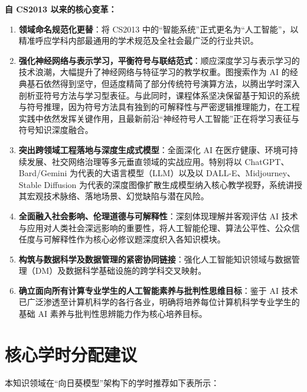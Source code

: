 \begin{preamblebox}[知识领域概述与变革]
\textbf{自 CS2013 以来的核心变革：}
\begin{enumerate}
    \item \textbf{领域命名规范化更替}：将 CS2013 中的“智能系统”正式更名为“人工智能”，以精准呼应学科内部最通用的学术规范及全社会最广泛的行业共识。
    \item \textbf{强化神经网络与表示学习，平衡符号与联结范式}：顺应深度学习与表示学习的技术浪潮，大幅提升了神经网络与特征学习的教学权重。图搜索作为 AI 的经典基石依然得到坚守，但适度精简了部分传统符号演算方法，以腾出学时深入剖析亚符号方法与学习型表征。与此同时，课程体系坚决保留基于知识的系统与符号推理，因为符号方法具有独到的可解释性与严密逻辑推理能力，在工程实践中依然发挥关键作用，且最新前沿“神经符号人工智能”正在将学习表征与符号知识深度融合。
    \item \textbf{突出跨领域工程落地与深度生成式模型}：全面深化 AI 在医疗健康、环境可持续发展、社交网络治理等多元垂直领域的实战应用。特别将以 ChatGPT、Bard/Gemini 为代表的大语言模型（LLM）以及以 DALL-E、Midjourney、Stable Diffusion 为代表的深度图像扩散生成模型纳入核心教学视野，系统讲授其宏观技术脉络、落地场景、幻觉缺陷与潜在风险。
    \item \textbf{全面融入社会影响、伦理道德与可解释性}：深刻体现理解并客观评估 AI 技术与应用对人类社会深远影响的重要性，将人工智能伦理、算法公平性、公众信任度与可解释性作为核心必修议题深度织入各知识模块。
    \item \textbf{构筑与数据科学及数据管理的紧密协同链接}：强化人工智能知识领域与数据管理（DM）及数据科学基础设施的跨学科交叉映射。
    \item \textbf{确立面向所有计算专业学生的人工智能素养与批判性思维目标}：鉴于 AI 技术已广泛渗透至计算机科学的各行各业，明确将培养每位计算机科学专业学生的基础 AI 素养与批判性思辨能力作为核心培养目标。
\end{enumerate}
\end{preamblebox}

\section{核心学时分配建议}

本知识领域在“向日葵模型”架构下的学时推荐如下表所示：

